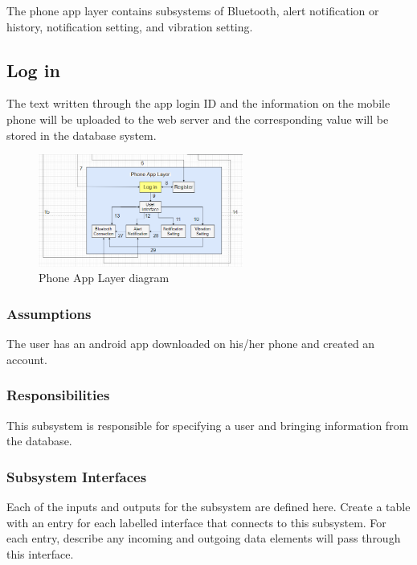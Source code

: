 The phone app layer contains subsystems of Bluetooth, alert notification or history, notification setting, and vibration setting.

\subsection{Log in}
The text written through the app login ID and the information on the mobile phone will be uploaded to the web server and the corresponding value will be stored in the database system. 

\begin{figure}[h!]
	\centering
 	\includegraphics[width=0.60\textwidth]{images/phone_login.png}
 \caption{Phone App Layer diagram}
\end{figure}

\subsubsection{Assumptions}
The user has an android app downloaded on his/her phone and created an account.

\subsubsection{Responsibilities}
This subsystem is responsible for specifying a user and bringing information from the database.

\subsubsection{Subsystem Interfaces}
Each of the inputs and outputs for the subsystem are defined here. Create a table with an entry for each labelled interface that connects to this subsystem. For each entry, describe any incoming and outgoing data elements will pass through this interface.

